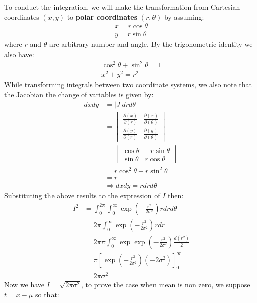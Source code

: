 \documentclass{article}
\begin{document}
To conduct the integration, we will make the transformation from Cartesian coordinates $(x, y)$ to \textbf{polar coordinates} $(r, \theta)$ by assuming:
\begin{align*}
    x = r \cos \theta \\
    y = r \sin \theta
\end{align*}
where $r$ and $\theta$ are arbitrary number and angle. By the trigonometric identity we also have:
\begin{align*}
    \cos^2 \theta + \sin^2 \theta = 1 \\
    x^2 + y^2 = r^2
\end{align*}
While transforming integrals between two coordinate systems, we also note that the Jacobian the change of variables is given by:
\begin{align*}
    dx dy &= |J| dr d\theta\\
    &= 
    \begin{vmatrix}
    \displaystyle{\frac{\partial (x)}{\partial (r)}} & \displaystyle{\frac{\partial (x)}{\partial (\theta)}}\\ 
    \displaystyle{\frac{\partial (y)}{\partial (r)}} & 
    \displaystyle{\frac{\partial (y)}{\partial (\theta)}}
    \end{vmatrix} \\
     &=
    \begin{vmatrix}
    \cos \theta & -r \sin \theta \\
    \sin \theta & r \cos \theta
    \end{vmatrix} \\
    &= r \cos^2 \theta + r \sin^2 \theta \\
    &= r \\
    & \Longrightarrow dxdy = r dr d\theta
\end{align*}
Substituting the above results to the expression of $I$ then:
\begin{align*}
    I^2 &= \int_0^{2 \pi} \int_0^\infty \exp \left( -\frac{r^2}{2 \sigma^2} \right) r dr d\theta \\
    &= 2 \pi \int_0^\infty \exp \left( -\frac{r^2}{2 \sigma^2} \right) r dr \\
    &= 2 \pi \pi \int_0^\infty \exp \exp \left( -\frac{r^2}{2 \sigma^2} \right) \frac{d(r^2)}{2} \\
    &= \pi \left[ \exp \left(- \frac{r^2}{2 \sigma^2} \right) (-2 \sigma^2) \right]_0^\infty \\
    &= 2 \pi \sigma^2
\end{align*}
Now we have $I = \sqrt{2 \pi \sigma^2}$, to prove the case when mean is non zero, we suppose $t = x - \mu$ so that:
\end{document}
